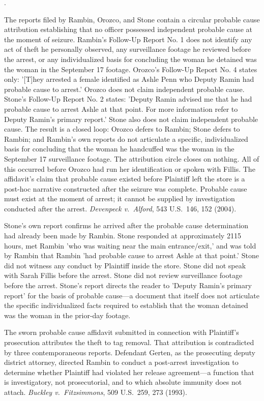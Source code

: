\documentclass[12pt,letterpaper]{article}
\newcounter{complaintpara}
\newenvironment{paras}{%
	\begin{list}{\arabic{complaintpara}.}{%
			\setlength{\leftmargin}{0.5in}%
			\setlength{\labelwidth}{0.4in}%
			\setlength{\labelsep}{0.1in}%
			\setlength{\itemsep}{0pt}%
			\setlength{\parsep}{0pt}%
			\setlength{\topsep}{6pt}%
		}%
	}{%
	\end{list}%
}
\begin{document}
\begin{paras}
		\item\label{fact:circular-pc} The reports filed by Rambin, Orozco, and Stone contain a circular probable cause attribution establishing that no officer possessed independent probable cause at the moment of seizure. Rambin's Follow-Up Report No. 1 does not identify any act of theft he personally observed, any surveillance footage he reviewed before the arrest, or any individualized basis for concluding the woman he detained was the woman in the September 17 footage. Orozco's Follow-Up Report No. 4 states only: '[T]hey arrested a female identified as Ashle Penn who Deputy Ramin had probable cause to arrest.' Orozco does not claim independent probable cause. Stone's Follow-Up Report No. 2 states: 'Deputy Ramin advised me that he had probable cause to arrest Ashle at that point. For more information refer to Deputy Ramin's primary report.' Stone also does not claim independent probable cause. The result is a closed loop: Orozco defers to Rambin; Stone defers to Rambin; and Rambin's own reports do not articulate a specific, individualized basis for concluding that the woman he handcuffed was the woman in the September 17 surveillance footage. The attribution circle closes on nothing. All of this occurred before Orozco had run her identification or spoken with Fillis. The affidavit's claim that probable cause existed before Plaintiff left the store is a post-hoc narrative constructed after the seizure was complete. Probable cause must exist at the moment of arrest; it cannot be supplied by investigation conducted after the arrest. \textit{Devenpeck v.\ Alford}, 543 U.S.\ 146, 152 (2004).
		\item\label{fact:stone-arrival} Stone's own report confirms he arrived after the probable cause determination had already been made by Rambin. Stone responded at approximately 2115 hours, met Rambin 'who was waiting near the main entrance/exit,' and was told by Rambin that Rambin 'had probable cause to arrest Ashle at that point.' Stone did not witness any conduct by Plaintiff inside the store. Stone did not speak with Sarah Fillis before the arrest. Stone did not review surveillance footage before the arrest. Stone's report directs the reader to 'Deputy Ramin's primary report' for the basis of probable cause---a document that itself does not articulate the specific individualized facts required to establish that the woman detained was the woman in the prior-day footage.
		\item\label{fact:affidavit} The sworn probable cause affidavit
		submitted in connection with Plaintiff's prosecution attributes
		the theft to tag removal. That attribution is contradicted by
		three contemporaneous reports. Defendant Gerten, as the
		prosecuting deputy district attorney, directed Rambin to
		conduct a post-arrest investigation to determine whether
		Plaintiff had violated her release agreement---a function that
		is investigatory, not prosecutorial, and to which absolute
		immunity does not attach. \textit{Buckley v.\ Fitzsimmons},
		509 U.S.\ 259, 273 (1993).
		

\end{paras}
\end{document}

